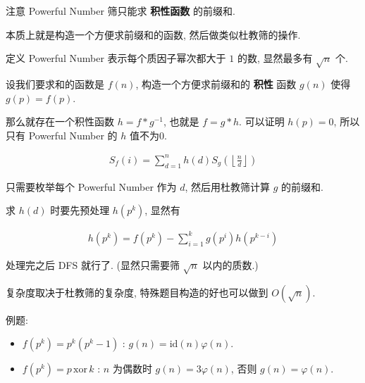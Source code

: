 注意 Powerful Number 筛只能求 \textbf{积性函数} 的前缀和.

本质上就是构造一个方便求前缀和的函数, 然后做类似杜教筛的操作.

定义 Powerful Number 表示每个质因子幂次都大于 $1$ 的数, 显然最多有 $\sqrt n$ 个.

设我们要求和的函数是 $f(n)$, 构造一个方便求前缀和的 \textbf{积性} 函数 $g(n)$ 使得 $g(p) = f(p)$.

那么就存在一个积性函数 $h = f * g ^ {-1}$, 也就是 $f = g *h$. 可以证明 $h(p) = 0$, 所以只有 Powerful Number 的 $h$ 值不为0.

$$ \begin{aligned}
	S_f(i) = \sum_{d = 1} ^ n h(d) S_g \left( \left\lfloor \frac n d \right\rfloor \right)
\end{aligned} $$

只需要枚举每个 Powerful Number 作为 $d$, 然后用杜教筛计算 $g$ 的前缀和.

求 $h(d)$ 时要先预处理 $h(p^k)$, 显然有

$$ \begin{aligned}
	h \left(p ^ k \right) = f \left(p ^ k \right) - \sum_{i = 1} ^ k g \left( p ^ i \right) h \left( p ^ {k - i} \right)
\end{aligned} $$

处理完之后 DFS 就行了. (显然只需要筛 $\sqrt n$ 以内的质数.)

复杂度取决于杜教筛的复杂度, 特殊题目构造的好也可以做到 $O \left( \sqrt n \right)$.

例题:

\begin{itemize}
	\item $f \left( p ^ k \right) = p ^ k \left( p ^ k - 1 \right)$ : $g(n) = \text{id}(n) \varphi(n)$.
	\item $f \left( p ^ k \right) = p \, \text{xor} \, k$ : $n$ 为偶数时 $g(n) = 3 \varphi(n)$, 否则 $g(n) = \varphi(n)$.
\end{itemize}